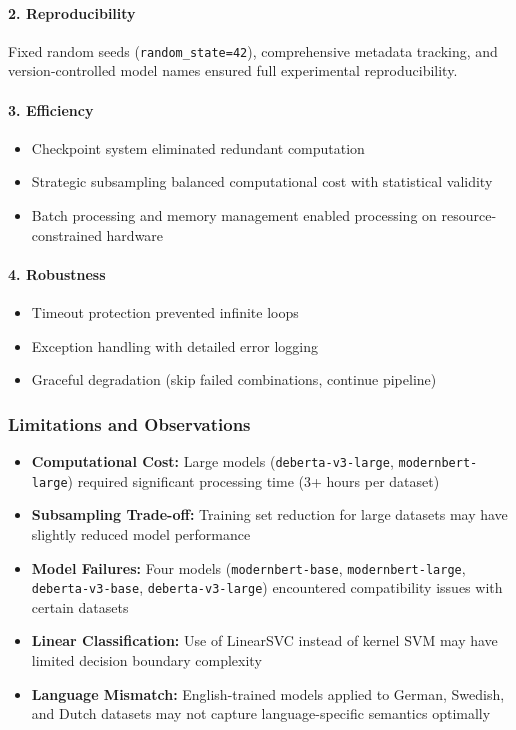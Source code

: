 \documentclass[11pt, titlepage, bibliography=totoc]{scrreprt}
\begin{document}
\paragraph{2. Reproducibility}
Fixed random seeds (\texttt{random\_state=42}), comprehensive metadata tracking, and version-controlled model names ensured full experimental reproducibility.

\paragraph{3. Efficiency}
\begin{itemize}
    \item Checkpoint system eliminated redundant computation
    \item Strategic subsampling balanced computational cost with statistical validity
    \item Batch processing and memory management enabled processing on resource-constrained hardware
\end{itemize}

\paragraph{4. Robustness}
\begin{itemize}
    \item Timeout protection prevented infinite loops
    \item Exception handling with detailed error logging
    \item Graceful degradation (skip failed combinations, continue pipeline)
\end{itemize}

\subsubsection{Limitations and Observations}

\begin{itemize}
    \item \textbf{Computational Cost:} Large models (\texttt{deberta-v3-large}, \texttt{modernbert-large}) required significant processing time (3+ hours per dataset)
    \item \textbf{Subsampling Trade-off:} Training set reduction for large datasets may have slightly reduced model performance
    \item \textbf{Model Failures:} Four models (\texttt{modernbert-base}, \texttt{modernbert-large}, \texttt{deberta-v3-base}, \texttt{deberta-v3-large}) encountered compatibility issues with certain datasets
    \item \textbf{Linear Classification:} Use of LinearSVC instead of kernel SVM may have limited decision boundary complexity
    \item \textbf{Language Mismatch:} English-trained models applied to German, Swedish, and Dutch datasets may not capture language-specific semantics optimally
\end{itemize}
\end{document}
